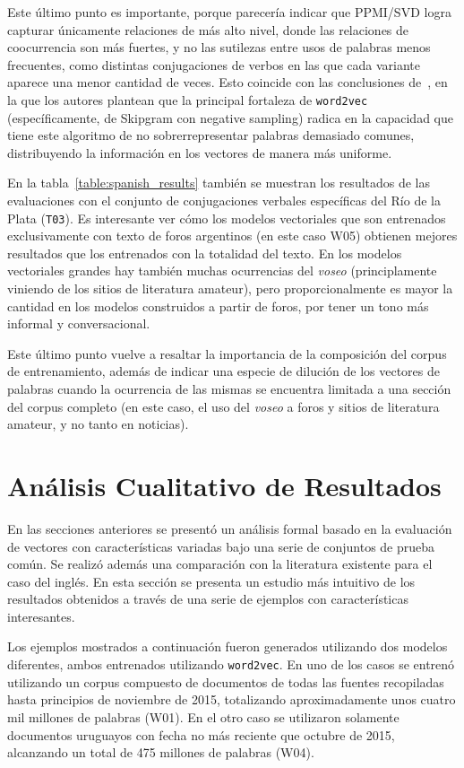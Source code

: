 Este último punto es importante, porque parecería indicar que PPMI/SVD logra capturar únicamente
relaciones de más alto nivel, donde las relaciones de coocurrencia son más fuertes, y no las
sutilezas entre usos de palabras menos frecuentes, como distintas conjugaciones de verbos en las que
cada variante aparece una menor cantidad de veces. Esto coincide con las conclusiones
de~\cite{Levy2014a}, en la que los autores plantean que la principal fortaleza de \texttt{word2vec}
(específicamente, de Skipgram con negative sampling) radica en la capacidad que tiene este algoritmo
de no sobrerrepresentar palabras demasiado comunes, distribuyendo la información en los vectores de
manera más uniforme.


En la tabla~\ref{table:spanish_results} también se muestran los resultados de las evaluaciones con
el conjunto de conjugaciones verbales específicas del Río de la Plata (\texttt{T03}). Es interesante
ver cómo los modelos vectoriales que son entrenados exclusivamente con texto de foros argentinos (en
este caso W05) obtienen mejores resultados que los entrenados con la totalidad del texto. En los
modelos vectoriales grandes hay también muchas ocurrencias del \textit{voseo} (principlamente
viniendo de los sitios de literatura amateur), pero proporcionalmente es mayor la cantidad en los
modelos construidos a partir de foros, por tener un tono más informal y conversacional.

Este último punto vuelve a resaltar la importancia de la composición del corpus de entrenamiento,
además de indicar una especie de dilución de los vectores de palabras cuando la ocurrencia de las
mismas se encuentra limitada a una sección del corpus completo (en este caso, el uso del
\textit{voseo} a foros y sitios de literatura amateur, y no tanto en noticias).


\section{Análisis Cualitativo de Resultados}

En las secciones anteriores se presentó un análisis formal basado en la evaluación de vectores con
características variadas bajo una serie de conjuntos de prueba común. Se realizó además
una comparación con la literatura existente para el caso del inglés. En esta sección se presenta
un estudio más intuitivo de los resultados obtenidos a través de una serie de ejemplos con
características interesantes.

Los ejemplos mostrados a continuación fueron generados utilizando dos modelos diferentes, ambos
entrenados utilizando \texttt{word2vec}. En uno de los casos se entrenó utilizando un corpus
compuesto de documentos de todas las fuentes recopiladas hasta principios de noviembre de 2015,
totalizando aproximadamente unos cuatro mil millones de palabras (W01). En el otro caso se
utilizaron solamente documentos uruguayos con fecha no más reciente que octubre de 2015, alcanzando
un total de 475 millones de palabras (W04).


